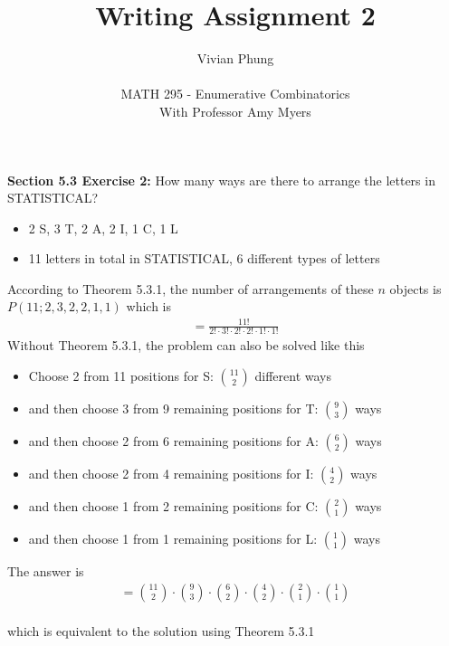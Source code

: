 \documentclass[12pt]{article}
\begin{document}
 
 
 
\title{Writing Assignment 2}%
\author{Vivian Phung\\ \\ %
MATH 295 - Enumerative Combinatorics\\With Professor Amy Myers} 

\maketitle
 

\textbf{Section 5.3 Exercise 2:} How many ways are there to arrange the letters in STATISTICAL? \
\begin{itemize}
  \item 2 S, 3 T, 2 A, 2 I, 1 C, 1 L
  \item 11 letters in total in STATISTICAL, 6 different types of letters
\end{itemize}
According to Theorem 5.3.1, the number of arrangements of these $n$ objects is $P(11; 2, 3, 2, 2, 1, 1)$ which is
\begin{align*}
= \frac{11!}{2! \cdot 3! \cdot 2! \cdot 2! \cdot 1! \cdot 1!}
\end{align*}Without Theorem 5.3.1, the problem can also be solved like this
\begin{itemize}
  \item Choose 2 from 11 positions for S: $\binom{11}{2}$ different ways
  \item and then choose 3 from 9 remaining positions for T: $\binom{9}{3}$ ways
  \item and then choose 2 from 6 remaining positions for A: $\binom{6}{2}$ ways
  \item and then choose 2 from 4 remaining positions for I: $\binom{4}{2}$ ways
  \item and then choose 1 from 2 remaining positions for C: $\binom{2}{1}$ ways
  \item and then choose 1 from 1 remaining positions for L: $\binom{1}{1}$ ways
\end{itemize}The answer is
\begin{align*}
= \binom{11}{2} \cdot \binom{9}{3} \cdot \binom{6}{2} \cdot \binom{4}{2} \cdot \binom{2}{1} \cdot \binom{1}{1}
\end{align*} \\which is equivalent to the solution using Theorem 5.3.1
 
\end{document}
